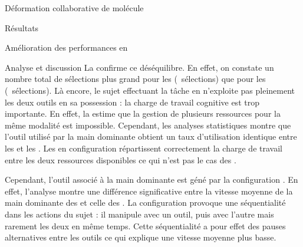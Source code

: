 \documentclass[myfrancais,ngerman,english,frenchb]{mythesis}
\begin{document}
\begin{mychapter}{Déformation collaborative de molécule}
\begin{mysection}{Résultats}
\begin{mysubsection}{Amélioration des performances en }
\begin{mysubsubsection}{Analyse et discussion}
					La  confirme ce déséquilibre.
					En effet, on constate un nombre total de sélections plus grand pour les  (~sélections) que pour les  (~sélections).
					Là encore, le sujet effectuant la tâche en  n'exploite pas pleinement les deux outils en sa possession : la charge de travail cognitive est trop importante.
					En effet, la   estime que la gestion de plusieurs ressources pour la même modalité est impossible.
					Cependant, les analyses statistiques montre que l'outil utilisé par la main dominante obtient un taux d'utilisation identique entre les  et les .
					Les  en configuration  répartissent correctement la charge de travail entre les deux ressources disponibles ce qui n'est pas le cas des .

					Cependant, l'outil associé à la main dominante est géné par la configuration .
					En effet, l'analyse montre une différence significative entre la vitesse moyenne de la main dominante des  et celle des .
					La configuration  provoque une séquentialité dans les actions du sujet : il manipule avec un outil, puis avec l'autre mais rarement les deux en même temps.
					Cette séquentialité a pour effet des pauses alternatives entre les outils ce qui explique une vitesse moyenne plus basse.


\end{mysubsubsection}
\end{mysubsection}
\end{mysection}
\end{mychapter}
\end{document}
